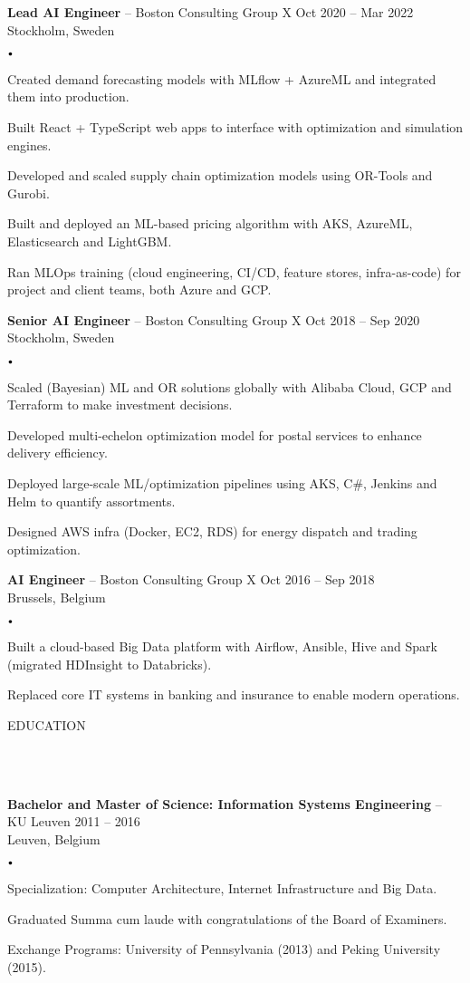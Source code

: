 \documentclass{article}
\newcommand{\header}[1]{
    {
        \hspace*{-4pt}
        \vspace*{8pt}
        \uppercase{#1}
    }
    \vspace*{-4pt} 
    \lineunder
    \vspace*{8pt}
}
\newcommand{\lineunder}{
    \vspace*{-8pt} \\ 
    \hspace*{-4pt} 
    \hrulefill \\
}
\newcommand{\experience}[5]{
    \vspace*{2pt}
    \textbf{#1} -- #2 \hfill #3 \\ 
    #4 \\
    #5
    \vspace*{2pt}
}
\newcommand{\spacedbullet}{
    $\vcenter{\hbox{\tiny$\bullet$}}$\hspace*{-2pt}
}
\newenvironment{bulletlist}{
    \begin{list}
        {\spacedbullet}{\setlength\leftmargin{10pt} 
        \topsep 0pt \itemsep -2pt}}{\vspace*{4pt}
    \end{list}
}
\begin{document}
\experience{Lead AI Engineer}{Boston Consulting Group X}{Oct 2020 -- Mar 2022}{Stockholm, Sweden}
{
    \begin{bulletlist}
        \item Created demand forecasting models with MLflow + AzureML and integrated them into production.
        \item Built React + TypeScript web apps to interface with optimization and simulation engines.
        \item Developed and scaled supply chain optimization models using OR-Tools and Gurobi.
        \item Built and deployed an ML-based pricing algorithm with AKS, AzureML, Elasticsearch and LightGBM.
        \item Ran MLOps training (cloud engineering, CI/CD, feature stores, infra-as-code) for project and client teams, both Azure and GCP.
    \end{bulletlist}
}

\experience{Senior AI Engineer}{Boston Consulting Group X}{Oct 2018 -- Sep 2020}{Stockholm, Sweden}
{
    \begin{bulletlist}
        \item Scaled (Bayesian) ML and OR solutions globally with Alibaba Cloud, GCP and Terraform to make investment decisions.
        \item Developed multi-echelon optimization model for postal services to enhance delivery efficiency.
        \item Deployed large-scale ML/optimization pipelines using AKS, C\#, Jenkins and Helm to quantify assortments.
        \item Designed AWS infra (Docker, EC2, RDS) for energy dispatch and trading optimization.
    \end{bulletlist}
}

\experience{AI Engineer}{Boston Consulting Group X}{Oct 2016 -- Sep 2018}{Brussels, Belgium}
{
    \begin{bulletlist}
        \item Built a cloud-based Big Data platform with Airflow, Ansible, Hive and Spark (migrated HDInsight to Databricks).
        \item Replaced core IT systems in banking and insurance to enable modern operations.
    \end{bulletlist}
}

\vspace*{4pt}

\header{Education}
\experience{Bachelor and Master of Science: Information Systems Engineering}{KU Leuven}{2011 -- 2016}{Leuven, Belgium}
{
    \begin{bulletlist}
        \item Specialization: Computer Architecture, Internet Infrastructure and Big Data.
        \item Graduated Summa cum laude with congratulations of the Board of Examiners.
        \item Exchange Programs: University of Pennsylvania (2013) and Peking University (2015).
    \end{bulletlist}
}
\end{document}
